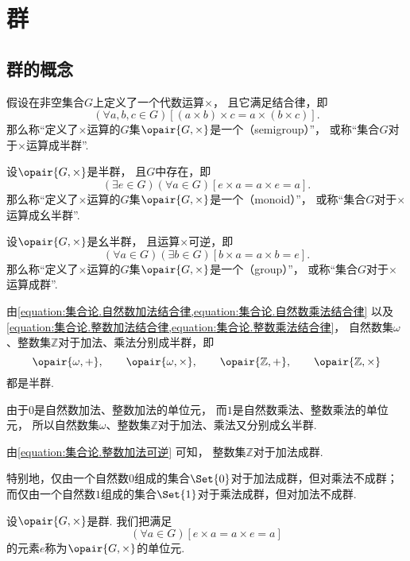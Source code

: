 \section{群}
\subsection{群的概念}
\begin{definition}
假设在非空集合\(G\)上定义了一个代数运算\(\times\)，
且它满足结合律，即\[
	(\forall a,b,c \in G)
	[(a \times b) \times c = a \times (b \times c)].
\]
那么称“定义了\(\times\)运算的\(G\)集\(\opair{G,\times}\)是一个（semigroup）”，
或称“集合\(G\)对于\(\times\)运算成半群”.
\end{definition}

\begin{definition}
设\(\opair{G,\times}\)是半群，
且\(G\)中存在，即\[
	(\exists e \in G)(\forall a \in G)
	[e \times a = a \times e = a].
\]
那么称“定义了\(\times\)运算的\(G\)集\(\opair{G,\times}\)是一个（monoid）”，
或称“集合\(G\)对于\(\times\)运算成幺半群”.
\end{definition}

\begin{definition}
设\(\opair{G,\times}\)是幺半群，
且运算\(\times\)可逆，即\[
	(\forall a \in G)(\exists b \in G)
	[b \times a = a \times b = e].
\]
那么称“定义了\(\times\)运算的\(G\)集\(\opair{G,\times}\)是一个（group）”，
或称“集合\(G\)对于\(\times\)运算成群”.
\end{definition}

由\cref{equation:集合论.自然数加法结合律,equation:集合论.自然数乘法结合律}
以及\cref{equation:集合论.整数加法结合律,equation:集合论.整数乘法结合律}，
自然数集\(\omega\)、整数集\(\mathbb{Z}\)对于加法、乘法分别成半群，即\[
	\opair{\omega,+}, \qquad
	\opair{\omega,\times}, \qquad
	\opair{\mathbb{Z},+}, \qquad
	\opair{\mathbb{Z},\times}
\]都是半群.

由于\(0\)是自然数加法、整数加法的单位元，
而\(1\)是自然数乘法、整数乘法的单位元，
所以自然数集\(\omega\)、整数集\(\mathbb{Z}\)对于加法、乘法又分别成幺半群.

由\cref{equation:集合论.整数加法可逆} 可知，
整数集\(\mathbb{Z}\)对于加法成群.

特别地，仅由一个自然数\(0\)组成的集合\(\Set{0}\)对于加法成群，但对乘法不成群；
而仅由一个自然数\(1\)组成的集合\(\Set{1}\)对于乘法成群，但对加法不成群.

\begin{definition}
设\(\opair{G,\times}\)是群.
我们把满足\[
    (\forall a \in G)
    [e \times a = a \times e = a]
\]的元素\(e\)称为\(\opair{G,\times}\)的单位元.
\end{definition}

